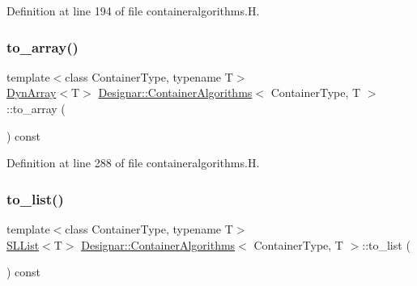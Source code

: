 Definition at line 194 of file containeralgorithms.\+H.

\mbox{\label{class_designar_1_1_container_algorithms_a2a358d26ad630d1bb5995bff81f66bc4}} 
\subsubsection{\texorpdfstring{to\+\_\+array()}{to\_array()}}
{\footnotesize\ttfamily template$<$class Container\+Type, typename T$>$ \\
\hyperlink{class_designar_1_1_dyn_array}{Dyn\+Array}$<$T$>$ \hyperlink{class_designar_1_1_container_algorithms}{Designar\+::\+Container\+Algorithms}$<$ Container\+Type, T $>$\+::to\+\_\+array (\begin{DoxyParamCaption}{ }\end{DoxyParamCaption}) const\hspace{0.3cm}{\ttfamily [inline]}}



Definition at line 288 of file containeralgorithms.\+H.

\mbox{\label{class_designar_1_1_container_algorithms_a7800ec47f0b49c369f7341f72c70692a}} 
\subsubsection{\texorpdfstring{to\+\_\+list()}{to\_list()}}
{\footnotesize\ttfamily template$<$class Container\+Type, typename T$>$ \\
\hyperlink{class_designar_1_1_s_l_list}{S\+L\+List}$<$T$>$ \hyperlink{class_designar_1_1_container_algorithms}{Designar\+::\+Container\+Algorithms}$<$ Container\+Type, T $>$\+::to\+\_\+list (\begin{DoxyParamCaption}{ }\end{DoxyParamCaption}) const\hspace{0.3cm}{\ttfamily [inline]}}



